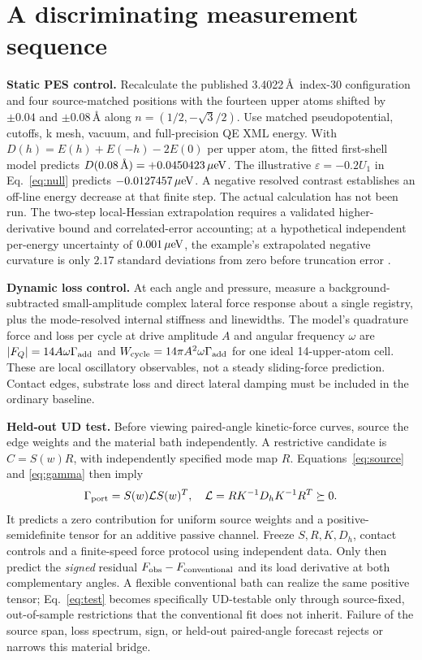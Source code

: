 \documentclass[9pt,a4paper,twocolumn]{extarticle}
\begin{document}
\section{A discriminating measurement sequence}
\textbf{Static PES control.} Recalculate the published 3.4022\,\AA\ index-30 configuration and four source-matched positions with the fourteen upper atoms shifted by $\pm0.04$ and $\pm0.08\,\text{\AA}$ along $n=(1/2,-\sqrt3/2)$. Use matched pseudopotential, cutoffs, k mesh, vacuum, and full-precision QE XML energy. With $D(h)=E(h)+E(-h)-2E(0)$ per upper atom, the fitted first-shell model predicts $D(0.08\,\text{\AA})=+0.0450423\,\mu{\rm eV}$. The illustrative $\varepsilon=-0.2U_1$ in Eq.~\eqref{eq:null} predicts $-0.0127457\,\mu{\rm eV}$. A negative resolved contrast establishes an off-line energy decrease at that finite step. The actual calculation has not been run. The two-step local-Hessian extrapolation requires a validated higher-derivative bound and correlated-error accounting; at a hypothetical independent per-energy uncertainty of $0.001\,\mu{\rm eV}$, the example's extrapolated negative curvature is only $2.17$ standard deviations from zero before truncation error \cite{udrecord}.

\textbf{Dynamic loss control.} At each angle and pressure, measure a background-subtracted small-amplitude complex lateral force response about a single registry, plus the mode-resolved internal stiffness and linewidths. The model's quadrature force and loss per cycle at drive amplitude $A$ and angular frequency $\omega$ are $|F_Q|=14A\omega\Gamma_{\rm add}$ and $W_{\rm cycle}=14\pi A^2\omega\Gamma_{\rm add}$ for one ideal 14-upper-atom cell. These are local oscillatory observables, not a steady sliding-force prediction. Contact edges, substrate loss and direct lateral damping must be included in the ordinary baseline.

\textbf{Held-out UD test.} Before viewing paired-angle kinetic-force curves, source the edge weights and the material bath independently. A restrictive candidate is $C=S(w)R$, with independently specified mode map $R$. Equations~\eqref{eq:source} and \eqref{eq:gamma} then imply
\begin{equation}
 \Gamma_{\rm port}=S(w)\mathcal L S(w)^T,\quad
 \mathcal L=RK^{-1}D_hK^{-1}R^T\succeq0.\label{eq:test}
\end{equation}
It predicts a zero contribution for uniform source weights and a positive-semidefinite tensor for an additive passive channel. Freeze $S,R,K,D_h$, contact controls and a finite-speed force protocol using independent data. Only then predict the \emph{signed} residual $F_{\rm obs}-F_{\rm conventional}$ and its load derivative at both complementary angles. A flexible conventional bath can realize the same positive tensor; Eq.~\eqref{eq:test} becomes specifically UD-testable only through source-fixed, out-of-sample restrictions that the conventional fit does not inherit. Failure of the source span, loss spectrum, sign, or held-out paired-angle forecast rejects or narrows this material bridge.
\end{document}
